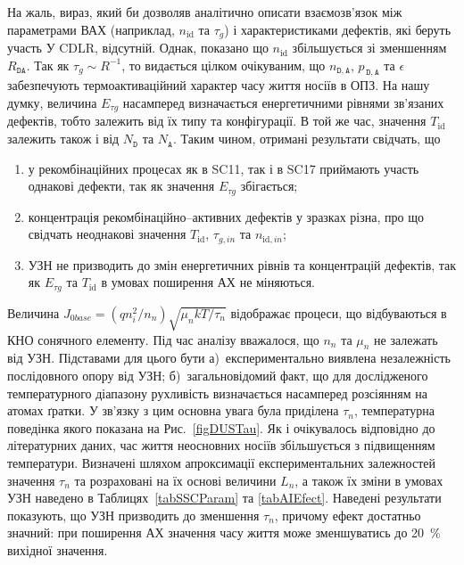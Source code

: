 На жаль, вираз, який би дозволяв аналітично описати взаємозв'язок між параметрами ВАХ (наприклад, $n_{\mathrm{id}}$ та $\tau_g$)
і характеристиками дефектів, які беруть участь У CDLR, відсутній.
Однак, показано \cite{CDLR:JAP1995,CDLR:SSP} що $n_{\mathrm{id}}$ збільшується зі зменшенням $R_{\mathtt{DA}}$.
Так як $\tau_g\sim R^{-1}$,
то видається цілком очікуваним, що $n_{\mathtt{D,A}}$, $p_{\,\mathtt{D,A}}$ та $\epsilon$ забезпечують термоактиваційний характер часу життя носіїв в ОПЗ.
На нашу думку, величина $E_{\tau g}$ насамперед визначається енергетичними рівнями зв'язаних дефектів, тобто
залежить від їх типу та конфігурації.
В той же час, значення $T_\mathrm{id}$ залежить також і від $N_\mathtt{D}$ та $N_\mathtt{A}$.
Таким чином, отримані результати свідчать, що
\begin{enumerate}[label=\asbuk*),leftmargin=0em,itemindent=1.5em]
\item у рекомбінаційних процесах як в SC11, так і в SC17 приймають участь однакові дефекти, так як значення $E_{\tau g}$ збігається;
\item концентрація рекомбінаційно--активних дефектів у зразках різна, про що свідчать неоднакові значення $T_\mathrm{id}$, $\tau_{g,in}$ та $n_{\mathrm{id},in}$;
\item УЗН не призводить до змін енергетичних рівнів та концентрацій дефектів, так як  $E_{\tau g}$ та $T_\mathrm{id}$ в умовах поширення АХ не міняються.
\end{enumerate}


Величина $J_{0base}=(qn_i^2/n_n)\sqrt{\mu_nkT/\tau_n}$ відображає процеси, що відбуваються в КНО сонячного елементу.
Під час аналізу  вважалося, що $n_n$ та $\mu_n$ не залежать від УЗН.
Підставами для цього бути
а)~експериментально виявлена незалежність послідовного опору від УЗН;
б)~загальновідомий факт, що для дослідженого температурного діапазону рухливість визначається насамперед розсіянням на атомах ґратки.
У зв'язку з цим основна увага була приділена $\tau_n$, температурна поведінка якого показана на Рис.~\ref{figDUSTau}.
Як і очікувалось відповідно до літературних даних, час життя неосновних носіїв збільшується з підвищенням температури.
Визначені шляхом апроксимації експериментальних залежностей значення $\tau_n$ та розраховані на їх основі величини $L_n$,
а також їх зміни в умовах УЗН наведено в Таблицях~\ref{tabSSCParam} та \ref{tabAIEfect}.
Наведені результати показують, що УЗН призводить до зменшення $\tau_n$, причому ефект достатньо значний:
при поширення АХ значення часу життя може зменшуватись до 20~\% вихідної значення.

